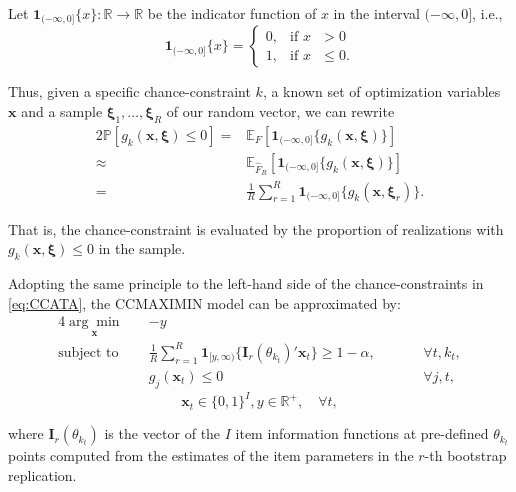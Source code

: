Let $\mathbf{1}_{(-\infty, 0]}\{x\} :\mathbb{R} \rightarrow \mathbb{R}$ be the indicator function of $x$ in the interval $(-\infty, 0]$, i.e.,
\begin{equation}
\mathbf{1}_{(-\infty, 0]}\{x\}= 
\begin{cases} 
0, & \mbox{if } x\mbox{ $> 0$} \\
1, & \mbox{if } x\mbox{ $\leq 0$}.
\end{cases}
\end{equation}

Thus, given a specific chance-constraint $k$, a known set of optimization variables $\mathbf{x}$ and a sample $\boldsymbol{\xi}_1, \ldots, \boldsymbol{\xi}_R$ of our random vector, we can rewrite
\begin{alignat}{2}
\mathbb{P}\left[g_k(\mathbf{x},\boldsymbol{\xi})\leq 0\right] = &  \mathbb{E}_{F}\left[\mathbf{1}_{(-\infty, 0]}\{g_k(\mathbf{x},\boldsymbol{\xi})\} \right]\\
\approx & \mathbb{E}_{\hat{F}_R}\left[\mathbf{1}_{(-\infty, 0]}\{g_k(\mathbf{x},\boldsymbol{\xi})\} \right] \\
= & \frac{1}{R} \sum_{r=1}^R \mathbf{1}_{(-\infty, 0]}\{ g_k(\mathbf{x},\boldsymbol{\xi}_r) \}.
\end{alignat}

That is, the chance-constraint is evaluated by the proportion of realizations with $g_k(\mathbf{x},\boldsymbol{\xi}) \leq 0$ in the sample.

Adopting the same principle to the left-hand side of the chance-constraints in \eqref{eq:CCATA}, the CCMAXIMIN model can be approximated by:
\begin{alignat}{4}\label{eq:CCMAXIMINapprox}
\underset{\mathbf{x}}{\arg \min} \quad & -y &&\quad  & \\
\nonumber
\text{subject to} \quad &\frac{1}{R}\sum_{r=1}^R\mathbf{1}_{[y,\infty)}\{ \mathbf{I}_r(\theta_{k_t})'\mathbf{x}_t \} \geq 1-\alpha ,  &&\quad & \forall t,k_t,\\\nonumber
& g_j(\mathbf{x}_t) \leq 0 &&\quad & \forall j,t,
\end{alignat}
\begin{equation}\nonumber
\mathbf{x}_t \in \{0,1\}^I, y \in \mathbb{R}^+, \quad \forall t,
\end{equation}

\noindent where $\mathbf{I}_{r}(\theta_{k_t})$ is the vector of the $I$ item information functions at pre-defined $\theta_{k_t}$ points computed from the estimates of the item parameters in the $r$-th bootstrap replication. 

